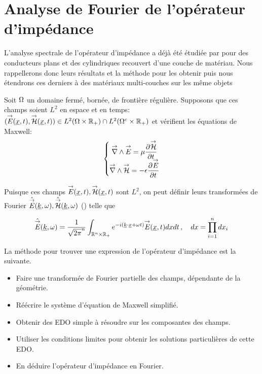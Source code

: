 \section{Analyse de Fourier de l'opérateur d'impédance}

L'analyse spectrale de l'opérateur d'impédance a déjà été étudiée par \cite{hoppe_impedance_1995} pour des conducteurs plans et des cylindriques recouvert d'une couche de matériau. Nous rappellerons donc leurs résultats et la méthode pour les obtenir puis nous étendrons ces derniers à des matériaux multi-couches sur les même objets

Soit $\Omega$ un domaine fermé, bornée, de frontière régulière. Supposons que ces champs soient $L^2$ en espace et en temps: $({\overset{\rightarrow}{E}}(\underline{x},t),{\overset{\rightarrow}{\mathcal{H}}}(\underline{x},t)) \in L^2(\Omega \times \mathbb R_+) \cap L^2(\Omega^c\times\mathbb R_+)$ et vérifient les équations de Maxwell:
\begin{equation}
    \left\lbrace 
    \begin{matrix}
    {\overset{\rightarrow}{\nabla}}\wedge {\overset{\rightarrow}{E}} = \mu \dfrac{\partial^{{}} {\overset{\rightarrow}{\mathcal{H}}}}{{\partial t}^{{}}} \\
    {\overset{\rightarrow}{\nabla}}\wedge {\overset{\rightarrow}{\mathcal{H}}} = -\epsilon \dfrac{\partial^{{}} {\overset{\rightarrow}{E}}}{{\partial t}^{{}}}
    \end{matrix}
    \right.
\end{equation}

Puisque ces champs ${\overset{\rightarrow}{E}}(\underline{x},t),{\overset{\rightarrow}{\mathcal{H}}}(\underline{x},t)$ sont $L^2$, on peut définir leurs transformées de Fourier $\hat{{\overset{\rightarrow}{E}}}(\underline{k},\omega), \hat{{\overset{\rightarrow}{\mathcal{H}}}}(\underline{k},\omega)$ (\cite[Théorème de Plancherel, p.~153]{yosida_functional_1995}) telle que

\begin{equation}
    \hat{{\overset{\rightarrow}{E}}} (\underline{k},\omega) = \dfrac{1}{\sqrt{2\pi}^n}\int_{\mathbb R^n\times\mathbb R_+} e^{-i(\underline{k} \cdot \underline{x}+\omega t)}{\overset{\rightarrow}{E}}(\underline{x},t) dxdt\,, \quad dx = \prod\limits_{i=1}^n dx_i
\end{equation}

La méthode pour trouver une expression de l'opérateur d'impédance est la suivante.
\begin{itemize}
\item Faire une transformée de Fourier partielle des champs, dépendante de la géométrie.
\item Réécrire le système d'équation de Maxwell simplifié.
\item Obtenir des EDO simple à résoudre sur les composantes des champs.
\item Utiliser les conditions limites pour obtenir les solutions particulières de cette EDO. 
\item En déduire l'opérateur d'impédance en Fourier.
\end{itemize}

